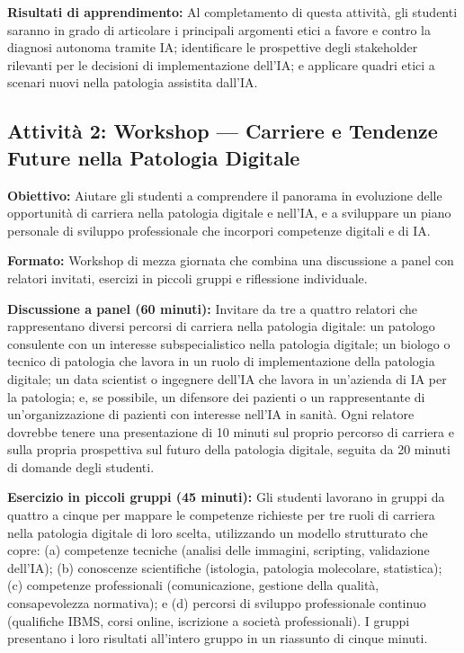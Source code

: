 \textbf{Risultati di apprendimento:} Al completamento di questa attività, gli studenti saranno in grado di articolare i principali argomenti etici a favore e contro la diagnosi autonoma tramite IA; identificare le prospettive degli stakeholder rilevanti per le decisioni di implementazione dell'IA; e applicare quadri etici a scenari nuovi nella patologia assistita dall'IA.

\subsection{Attività 2: Workshop --- Carriere e Tendenze Future nella Patologia Digitale}

\textbf{Obiettivo:} Aiutare gli studenti a comprendere il panorama in evoluzione delle opportunità di carriera nella patologia digitale e nell'IA, e a sviluppare un piano personale di sviluppo professionale che incorpori competenze digitali e di IA.

\textbf{Formato:} Workshop di mezza giornata che combina una discussione a panel con relatori invitati, esercizi in piccoli gruppi e riflessione individuale.

\textbf{Discussione a panel (60 minuti):} Invitare da tre a quattro relatori che rappresentano diversi percorsi di carriera nella patologia digitale: un patologo consulente con un interesse subspecialistico nella patologia digitale; un biologo o tecnico di patologia che lavora in un ruolo di implementazione della patologia digitale; un data scientist o ingegnere dell'IA che lavora in un'azienda di IA per la patologia; e, se possibile, un difensore dei pazienti o un rappresentante di un'organizzazione di pazienti con interesse nell'IA in sanità. Ogni relatore dovrebbe tenere una presentazione di 10 minuti sul proprio percorso di carriera e sulla propria prospettiva sul futuro della patologia digitale, seguita da 20 minuti di domande degli studenti.

\textbf{Esercizio in piccoli gruppi (45 minuti):} Gli studenti lavorano in gruppi da quattro a cinque per mappare le competenze richieste per tre ruoli di carriera nella patologia digitale di loro scelta, utilizzando un modello strutturato che copre: (a) competenze tecniche (analisi delle immagini, scripting, validazione dell'IA); (b) conoscenze scientifiche (istologia, patologia molecolare, statistica); (c) competenze professionali (comunicazione, gestione della qualità, consapevolezza normativa); e (d) percorsi di sviluppo professionale continuo (qualifiche IBMS, corsi online, iscrizione a società professionali). I gruppi presentano i loro risultati all'intero gruppo in un riassunto di cinque minuti.

